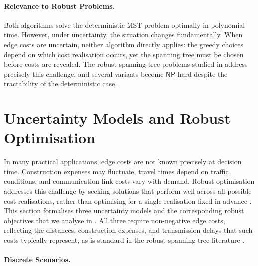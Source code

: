 \paragraph{Relevance to Robust Problems.}

Both algorithms solve the deterministic MST problem optimally in polynomial time.
However, under uncertainty, the situation changes fundamentally.
When edge costs are uncertain, neither algorithm directly applies: the greedy choices depend on which cost realisation occurs, yet the spanning tree must be chosen before costs are revealed.
The robust spanning tree problems studied in  address precisely this challenge, and several variants become $\mathsf{NP}$-hard despite the tractability of the deterministic case.

% 
\section{Uncertainty Models and Robust Optimisation}\label{sec:uncertainty}

In many practical applications, edge costs are not known precisely at decision time.
Construction expenses may fluctuate, travel times depend on traffic conditions, and communication link costs vary with demand.
Robust optimisation addresses this challenge by seeking solutions that perform well across all possible cost realisations, rather than optimising for a single realisation fixed in advance \cite{KouvelisYu1997}.
This section formalises three uncertainty models and the corresponding robust objectives that we analyse in .
All three require non-negative edge costs, reflecting the distances, construction expenses, and transmission delays that such costs typically represent, as is standard in the robust spanning tree literature \cite{Goerigk2021RCO,KouvelisYu1997}.

\paragraph{Discrete Scenarios.}

